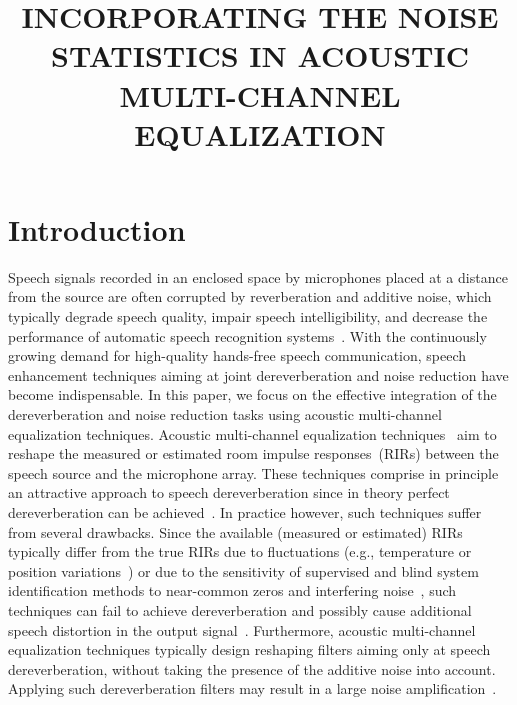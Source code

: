 \documentclass{aes60i}
\affiliation{University of Oldenburg, Dept. of Medical Physics and Acoustics, and Cluster of Excellence Hearing4All, Oldenburg, Germany}
\title{INCORPORATING THE NOISE STATISTICS IN ACOUSTIC MULTI-CHANNEL EQUALIZATION}
\begin{document}
\newlength\figureheight
\newlength\figurewidth
\setlength\figureheight{2.5cm}
\setlength{}

\maketitle 


\section{Introduction}

Speech signals recorded in an enclosed space by microphones placed at a distance from the source are often corrupted by reverberation and additive noise, which typically degrade speech quality, impair speech intelligibility, and decrease the performance of automatic speech recognition systems~\cite{Beutelmann_2006,Sehr_phd,Maas_ICASSP_2012}. 
With the continuously growing demand for high-quality hands-free speech communication, speech enhancement techniques aiming at joint dereverberation and noise reduction have become indispensable.
In this paper, we focus on the effective integration of the dereverberation and noise reduction tasks using acoustic multi-channel equalization techniques.
\newline
Acoustic multi-channel equalization techniques~\cite{Miyoshi_ITASS_1988,Kallinger_ICASSP_2006,Zhang_IWAENC_2010,Kodrasi_ITASLP_2013,Lim_ITASLP_2014} aim to reshape the measured or estimated room impulse responses~(RIRs) between the speech source and the microphone array. 
These techniques comprise in principle an attractive approach to speech dereverberation since in theory perfect dereverberation can be achieved~\cite{Miyoshi_ITASS_1988}.
In practice however, such techniques suffer from several drawbacks. 
Since the available (measured or estimated) RIRs typically differ from the true RIRs due to fluctuations (e.g., temperature or position variations~\cite{Radlovic_ITSA_2000}) or due to the sensitivity of supervised and blind system identification methods to near-common zeros and interfering noise~\cite{Haque_SPL_2008,Lin_ITASLP_2012}, such techniques can fail to achieve dereverberation and possibly cause additional speech distortion in the output signal~\cite{Zhang_IWAENC_2010,Kodrasi_ITASLP_2013}.
Furthermore, acoustic multi-channel equalization techniques typically design reshaping filters aiming only at speech dereverberation, without taking the presence of the additive noise into account. 
Applying such dereverberation filters may result in a large noise amplification~\cite{Kodrasi_ITASLP_2013}.
\end{document}
